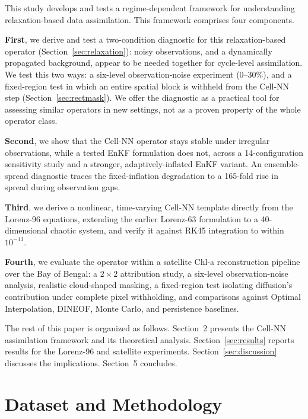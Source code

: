 \documentclass[final,5p,times,twocolumn,authoryear]{elsarticle}
\begin{document}
This study develops and tests a regime-dependent framework for
understanding relaxation-based data assimilation. This framework
comprises four components.

\textbf{First}, we derive and test a two-condition diagnostic for
this relaxation-based operator (Section~\ref{sec:relaxation}): noisy
observations, and a dynamically propagated background, appear to be
needed together for cycle-level assimilation. We test this two
ways: a six-level observation-noise experiment (0--30\%), and a
fixed-region test in which an entire spatial block is withheld from
the Cell-NN step (Section~\ref{sec:rectmask}). We offer the
diagnostic as a practical tool for assessing similar operators in new
settings, not as a proven property of the whole operator class.

\textbf{Second}, we show that the Cell-NN operator stays stable under
irregular observations, while a tested EnKF formulation does not,
across a 14-configuration sensitivity study and a stronger,
adaptively-inflated EnKF variant. An ensemble-spread diagnostic
traces the fixed-inflation degradation to a 165-fold rise in spread
during observation gaps.

\textbf{Third}, we derive a nonlinear, time-varying Cell-NN template
directly from the Lorenz-96 equations, extending the earlier
Lorenz-63 formulation to a 40-dimensional chaotic system, and verify
it against RK45 integration to within $10^{-13}$.

\textbf{Fourth}, we evaluate the operator within a satellite Chl-a
reconstruction pipeline over the Bay of Bengal: a $2\times2$
attribution study, a six-level observation-noise analysis, realistic
cloud-shaped masking, a fixed-region test isolating diffusion's
contribution under complete pixel withholding, and comparisons
against Optimal Interpolation, DINEOF, Monte Carlo, and persistence
baselines.

The rest of this paper is organized as follows. Section~2 presents
the Cell-NN assimilation framework and its theoretical analysis.
Section~\ref{sec:results} reports results for the Lorenz-96 and
satellite experiments. Section~\ref{sec:discussion} discusses the
implications. Section~5 concludes.

\section{Dataset and Methodology}
\end{document}
